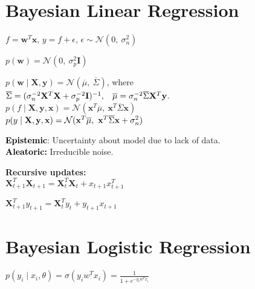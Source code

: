 \section{Bayesian Linear Regression} $f = \mathbf{w}^T\mathbf{x}$, $y = f + \epsilon$, $\epsilon \sim \mathcal{N}(0, \ \sigma_n^2)$

\vspace*{-0.5mm}
$p(\mathbf{w}) = \mathcal{N}(0, \ \sigma_p^2 \mathbf{I})$

\vspace*{-0.5mm}
$p(\mathbf{w} \mid \mathbf{X, y}) = \mathcal{N}( \overline{\mu}, \ \overline{\Sigma})$, where\\
\hspace*{3mm}$\overline{\Sigma} = (\sigma_n^{-2}\mathbf{X}^T\mathbf{X} +  \sigma_p^{-2}\mathbf{I})^{-1},
\\\hspace*{3mm}\overline{\mu} = \sigma_n^{-2}\overline{\Sigma} \mathbf{X}^T\mathbf{y}$.\\
$p(f \mid \mathbf{X,y,x}) = \mathcal{N}(\mathbf{x}^T\overline{\mu}, \
{\mathbf{x}}^T \overline{\Sigma} \mathbf{x})$\\
$p(y \mid \mathbf{X,y,x}) = \mathcal{N}({\mathbf{x}}^T \overline{\mu}, \ 
\textcolor{black}{{\mathbf{x}}^T \overline{\Sigma} \mathbf{x}} + \textcolor{black}{\sigma_n^2})$

\textcolor{black}{\textbf{Epistemic}}: Uncertainty about model due to lack of data. \\
\textcolor{black}{\textbf{Aleatoric:}} Irreducible noise.

\textbf{Recursive updates:} \\
$\mathbf{X}_{t+1}^T \mathbf{X}_{t+1} = \mathbf{X}_{t}^T \mathbf{X}_{t} + x_{t+1} x_{t+1}^T$

$\mathbf{X}_{t+1}^T y_{t+1} = \mathbf{X}_{t}^T y_{t} + y_{t+1} x_{t+1}$

\section{Bayesian Logistic Regression} $p(y_i \mid  x_i, \theta) = \sigma(y_i w^T x_i)= \frac{1}{1 + e^{-y_iw^Tx_i}}$


